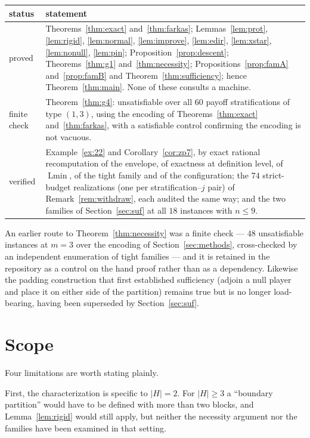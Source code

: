\documentclass[11pt]{article}
\newcommand{\Lmin}{\operatorname{Lmin}}
\begin{document}
\begin{center}
\begin{tabular}{lp{}}
\toprule
\textbf{status} & \textbf{statement}\\
\midrule
proved &
 Theorems~\ref{thm:exact} and~\ref{thm:farkas};
 Lemmas~\ref{lem:prot}, \ref{lem:rigid}, \ref{lem:normal}, \ref{lem:improve},
 \ref{lem:edir}, \ref{lem:xstar}, \ref{lem:nonull}, \ref{lem:pin};
 Proposition~\ref{prop:descent}; Theorems~\ref{thm:g1}
 and~\ref{thm:necessity}; Propositions~\ref{prop:famA}
 and~\ref{prop:famB} and Theorem~\ref{thm:sufficiency}; hence
 Theorem~\ref{thm:main}.  None of these consults a machine.\\
finite check &
 Theorem~\ref{thm:g4}: unsatisfiable over all $60$ payoff stratifications of
 type $(1,3)$, using the encoding of Theorems~\ref{thm:exact}
 and~\ref{thm:farkas}, with a satisfiable control confirming the encoding is
 not vacuous.\\
verified &
 Example~\ref{ex:22} and Corollary~\ref{cor:zp7}, by exact rational
 recomputation of the envelope, of exactness at definition level, of $\Lmin$,
 of the tight family and of the configuration; the $74$ strict-budget
 realizations (one per stratification--$j$ pair) of
 Remark~\ref{rem:withdraw}, each audited the same way; and
 the two families of Section~\ref{sec:suf} at all $18$ instances with
 $n\le9$.\\
\bottomrule
\end{tabular}
\end{center}

An earlier route to Theorem~\ref{thm:necessity} was a finite check --- $48$
unsatisfiable instances at $m=3$ over the encoding of
Section~\ref{sec:methods}, cross-checked by an independent enumeration of tight
families --- and it is retained in the repository as a control on the hand
proof rather than as a dependency.  Likewise the padding construction that
first established sufficiency (adjoin a null player and place it on either side
of the partition) remains true but is no longer load-bearing, having been
superseded by Section~\ref{sec:suf}.

\section{Scope}\label{sec:scope}

Four limitations are worth stating plainly.

First, the characterization is specific to $|H|=2$.  For $|H|\ge3$ a
``boundary partition'' would have to be defined with more than two blocks, and
Lemma~\ref{lem:rigid} would still apply, but neither the necessity argument nor
the families have been examined in that setting.
\end{document}
